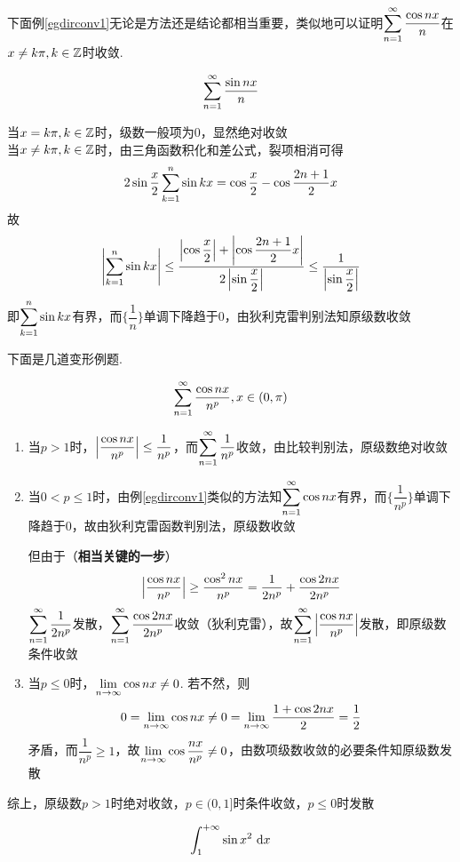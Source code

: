\par 下面例\ref{egdirconv1}无论是方法还是结论都相当重要，类似地可以证明$\displaystyle\sum_{n=1}^{\infty}\dfrac{\cos nx}{n}$在$x\neq k\pi,k\in\mathbb{Z}$时收敛.
\begin{example}
\[\displaystyle\sum_{n=1}^{\infty}\dfrac{\sin nx}{n}\]
\label{egdirconv1}
\end{example}
\begin{analysis}
当$x=k\pi,k\in\mathbb{Z}$时，级数一般项为$0$，显然绝对收敛\\
当$x\neq k\pi,k\in\mathbb{Z}$时，由三角函数积化和差公式，裂项相消可得
\[2\sin\dfrac{x}{2}\displaystyle\sum_{k=1}^{n}\sin kx=\cos\dfrac{x}{2}-\cos\dfrac{2n+1}{2}x\]
故
\[\left|\displaystyle\sum_{k=1}^{n}\sin kx\right|\leq\dfrac{\left|\cos\dfrac{x}{2}\right|+\left|\cos\dfrac{2n+1}{2}x\right|}{2\left|\sin\dfrac{x}{2}\right|}\leq\dfrac{1}{\left|\sin\dfrac{x}{2}\right|}\]
即$\displaystyle\sum_{k=1}^{n}\sin kx$有界，而$\{\dfrac{1}{n}\}$单调下降趋于$0$，由狄利克雷判别法知原级数收敛
\end{analysis}
\par 下面是几道变形例题.
\begin{example}
\[\displaystyle\sum_{n=1}^{\infty}\frac{\cos nx}{n^p},x\in(0,\pi)\]
\end{example}
\begin{analysis}
\begin{enumerate}
	\item 当$p>1$时，$\left|\dfrac{\cos nx}{n^p}\right|\leq\dfrac{1}{n^p}$，而$\displaystyle\sum_{n=1}^{\infty}\dfrac{1}{n^p}$收敛，由比较判别法，原级数绝对收敛\par
	\item 当$0<p\leq 1$时，由例\ref{egdirconv1}类似的方法知$\displaystyle\sum_{n=1}^{\infty}\cos nx$有界，而$\{\dfrac{1}{n^p}\}$单调下降趋于$0$，故由狄利克雷函数判别法，原级数收敛\par
但由于（\textbf{相当关键的一步}）
\[\left|\dfrac{\cos nx}{n^p}\right|\geq\dfrac{\cos^2 nx}{n^p}=\dfrac{1}{2n^p}+\dfrac{\cos 2nx}{2n^p}\]
$\displaystyle\sum_{n=1}^{\infty}\dfrac{1}{2n^p}$发散，$\displaystyle\sum_{n=1}^{\infty}\dfrac{\cos 2nx}{2n^p}$收敛（狄利克雷），故$\displaystyle\sum_{n=1}^{\infty}\left|\dfrac{\cos nx}{n^p}\right|$发散，即原级数条件收敛\par
	\item 当$p\leq 0$时，$\displaystyle\lim_{n\to\infty}\cos nx\neq 0$. 若不然，则
\[0=\displaystyle\lim_{n\to\infty}\cos nx\neq 0=\displaystyle\lim_{n\to\infty}\dfrac{1+\cos 2nx}{2}=\dfrac{1}{2}\]
矛盾，而$\dfrac{1}{n^p}\geq 1$，故$\displaystyle\lim_{n\to\infty}\cos\dfrac{nx}{n^p}\neq 0$，由数项级数收敛的必要条件知原级数发散
\end{enumerate}
综上，原级数$p>1$时绝对收敛，$p\in(0,1]$时条件收敛，$p\leq 0$时发散
\end{analysis}
\begin{example}
\label{countereg_conver_integ}
\[\displaystyle\int_{1}^{+\infty}{\sin x^2}\,\,\mathrm{d} x\]
\end{example}
